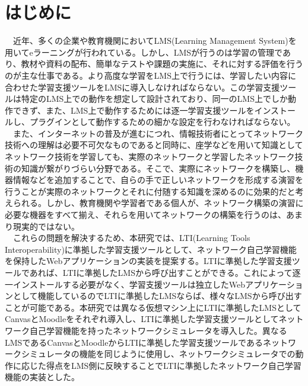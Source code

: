 \section{はじめに}
\label{tag:first}
　近年、多くの企業や教育機関においてLMS(Learning Management System)を用いてeラーニングが行われている。しかし、LMSが行うのは学習の管理であり、教材や資料の配布、簡単なテストや課題の実施に、それに対する評価を行うのが主な仕事である。より高度な学習をLMS上で行うには、学習したい内容に合わせた学習支援ツールをLMSに導入しなければならない。この学習支援ツールは特定のLMS上での動作を想定して設計されており、同一のLMS上でしか動作できず、また、LMS上で動作するためには逐一学習支援ツールをインストールし、プラグインとして動作するための細かな設定を行わなければならない。\\
　また、インターネットの普及が進むにつれ、情報技術者にとってネットワーク技術への理解は必要不可欠なものであると同時に、座学などを用いて知識としてネットワーク技術を学習しても、実際のネットワークと学習したネットワーク技術の知識が繋がりづらい分野である。そこで、実際にネットワークを構築し、機器情報などを追加することで、自らの手で正しいネットワークを形成する演習を行うことが実際のネットワークとそれに付随する知識を深めるのに効果的だと考えられる。しかし、教育機関や学習者である個人が、ネットワーク構築の演習に必要な機器をすべて揃え、それらを用いてネットワークの構築を行うのは、あまり現実的ではない。\\
　これらの問題を解決するため、本研究では、LTI(Learning Tools Interoperability)に準拠した学習支援ツールとして、ネットワーク自己学習機能を保持したWebアプリケーションの実装を提案する。LTIに準拠した学習支援ツールであれば、LTIに準拠したLMSから呼び出すことができる。これによって逐一インストールする必要がなく、学習支援ツールは独立したWebアプリケーションとして機能しているのでLTIに準拠したLMSならば、様々なLMSから呼び出すことが可能である。本研究では異なる仮想マシン上にLTIに準拠したLMSとしてCanvasとMoodleをそれぞれ導入し、LTIに準拠した学習支援ツールとしてネットワーク自己学習機能を持ったネットワークシミュレータを導入した。異なるLMSであるCanvasとMoodleからLTIに準拠した学習支援ツールであるネットワークシミュレータの機能を同じように使用し、ネットワークシミュレータでの動作に応じた得点をLMS側に反映することでLTIに準拠したネットワーク自己学習機能の実装とした。
